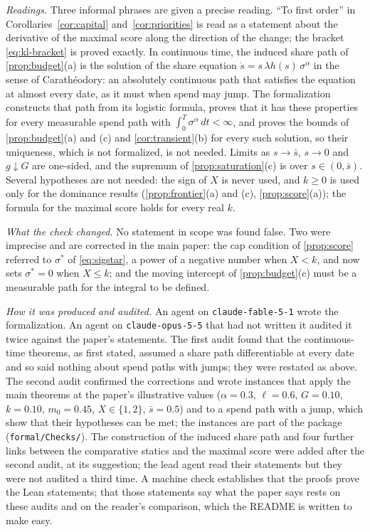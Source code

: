 \emph{Readings.} Three informal phrases are given a precise reading. ``To first order'' in Corollaries~\ref{cor:capital} and~\ref{cor:priorities} is read as a statement about the derivative of the maximal score along the direction of the change; the bracket \eqref{eq:kl-bracket} is proved exactly. In continuous time, the induced share path of \autoref{prop:budget}(a) is the solution of the share equation $\dot s=s\,\lambda h(s)\,\sigma^\alpha$ in the sense of Carath\'eodory: an absolutely continuous path that satisfies the equation at almost every date, as it must when spend may jump. The formalization constructs that path from its logistic formula, proves that it has these properties for every measurable spend path with $\int_0^T\sigma^\alpha\,dt<\infty$, and proves the bounds of \autoref{prop:budget}(a) and (c) and \autoref{cor:transient}(b) for every such solution, so their uniqueness, which is not formalized, is not needed. Limits as $s\to\bar s$, $s\to0$ and $g\downarrow G$ are one-sided, and the supremum of \autoref{prop:saturation}(c) is over $s\in(0,\bar s)$. Several hypotheses are not needed: the sign of $X$ is never used, and $k\ge0$ is used only for the dominance results (\autoref{prop:frontier}(a) and (c), \autoref{prop:score}(a)); the formula for the maximal score holds for every real $k$.

\emph{What the check changed.} No statement in scope was found false. Two were imprecise and are corrected in the main paper: the cap condition of \autoref{prop:score} referred to $\sigma^*$ of \eqref{eq:sigstar}, a power of a negative number when $X<k$, and now sets $\sigma^*=0$ when $X\le k$; and the moving intercept of \autoref{prop:budget}(c) must be a measurable path for the integral to be defined.

\emph{How it was produced and audited.} An agent on \texttt{claude-fable-5-1} wrote the formalization. An agent on \texttt{claude-opus-5-5} that had not written it audited it twice against the paper's statements. The first audit found that the continuous-time theorems, as first stated, assumed a share path differentiable at every date and so said nothing about spend paths with jumps; they were restated as above. The second audit confirmed the corrections and wrote instances that apply the main theorems at the paper's illustrative values ($\alpha=0.3$, $\ell=0.6$, $G=0.10$, $k=0.10$, $m_0=0.45$, $X\in\{1,2\}$, $\bar s=0.5$) and to a spend path with a jump, which show that their hypotheses can be met; the instances are part of the package (\texttt{formal/Checks/}). The construction of the induced share path and four further links between the comparative statics and the maximal score were added after the second audit, at its suggestion; the lead agent read their statements but they were not audited a third time. A machine check establishes that the proofs prove the Lean statements; that those statements say what the paper says rests on these audits and on the reader's comparison, which the README is written to make easy.
